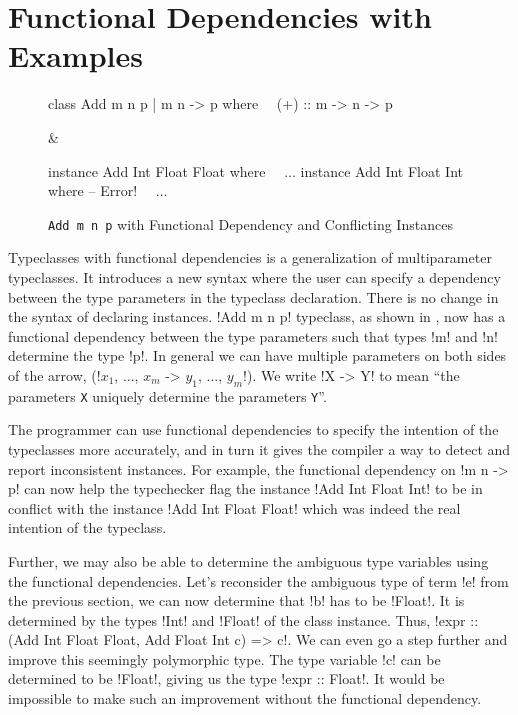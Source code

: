 \documentclass[format=acmsmall,manuscript,review,screen,nonacm,margin=1in,11pt]{acmart}
\begin{document}
\section{Functional Dependencies with Examples}\label{sec:fd}
\begin{figure}[ht]
  \footnotesize
  \begin{tabularx}\textwidth{X X}
\begin{code}^^J
class Add m n p | m n -> p where^^J
\ \  (+) :: m -> n -> p^^J
\end{code}&%
\begin{code}^^J
instance Add Int Float Float where^^J
\ \  $\ldots$^^J
^^J
instance Add Int Float Int where -- Error!^^J
\ \  $\ldots$^^J
\end{code}
  \end{tabularx}
  \caption{\texttt{Add m n p} with Functional Dependency and Conflicting Instances}
  \label{fig:add-tc-fd}
\end{figure}

Typeclasses with functional dependencies\cite{jones_tcfd_2000} is a generalization of multiparameter typeclasses.
It introduces a new syntax where the user can specify a dependency between the type parameters
in the typeclass declaration. There is no change in the syntax of declaring instances.
!Add m n p! typeclass, as shown in , now has a functional dependency
between the type parameters such that types !m! and !n! determine the type !p!.
In general we can have multiple parameters on both sides of the arrow,
(!$x_1$, ..., $x_m$ -> $y_1$, ..., $y_m$!). We write !X -> Y! to mean
``the parameters \texttt{X} uniquely determine the parameters \texttt{Y}''.

The programmer can use functional dependencies to specify the intention of the typeclasses
more accurately, and in turn it gives the compiler a way to detect and report inconsistent instances.
For example, the functional dependency on !m n -> p!
can now help the typechecker flag the instance !Add Int Float Int! to be in conflict with the instance
!Add Int Float Float! which was indeed the real intention of the typeclass.

Further, we may also be able to determine the ambiguous type variables using the functional dependencies.
Let's reconsider the ambiguous type of term !e! from the previous section, we can now determine
that !b! has to be !Float!. It is determined by the types !Int! and !Float! of the class instance.
Thus, !expr :: (Add Int Float Float, Add Float Int c) => c!.
We can even go a step further and improve this seemingly polymorphic type.
The type variable !c! can be determined to be !Float!, giving us the type !expr :: Float!.
It would be impossible to make such an improvement without the functional dependency.
\end{document}
